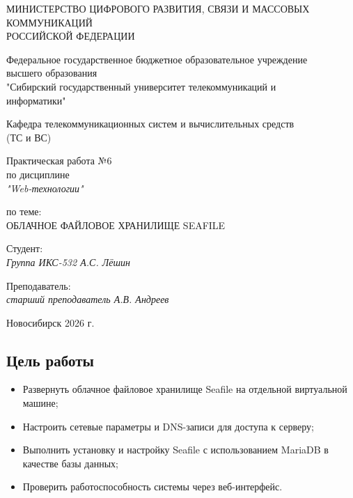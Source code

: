 \documentclass[a4paper,14pt,oneside,openany]{memoir}
\begin{document}
\thispagestyle{empty}

\begin{center}
    МИНИСТЕРСТВО ЦИФРОВОГО РАЗВИТИЯ, СВЯЗИ И МАССОВЫХ \\ КОММУНИКАЦИЙ \\ РОССИЙСКОЙ ФЕДЕРАЦИИ

    \vspace{20pt}

    Федеральное государственное бюджетное образовательное учреждение \\ высшего образования \\
    "Сибирский государственный университет телекоммуникаций и \\ информатики"

    \vspace{20pt}

    Кафедра телекоммуникационных систем и вычислительных средств \\ (ТС и ВС)
\end{center}

\vfill

\begin{center}
    Практическая работа №6 \\
    по дисциплине \\
    \textit{"Web-технологии"}

    \vspace{20pt}

    по теме: \\
    \uppercase{Облачное файловое хранилище Seafile}
\end{center}

\vfill

\noindent Студент: \\
\textit{Группа ИКС-532 \hfill А.С. Лёшин}

\vspace{20pt}

\noindent Преподаватель: \\
\textit{старший преподаватель \hfill А.В. Андреев}

\vfill

\begin{center}
    Новосибирск 2026 г.
\end{center}

\newpage
\setcounter{page}{2}
\OnehalfSpacing*

\subsection*{Цель работы}
\begin{itemize}
    \item Развернуть облачное файловое хранилище Seafile на отдельной виртуальной машине;
    \item Настроить сетевые параметры и DNS-записи для доступа к серверу;
    \item Выполнить установку и настройку Seafile с использованием MariaDB в качестве базы данных;
    \item Проверить работоспособность системы через веб-интерфейс.
\end{itemize}
\end{document}

